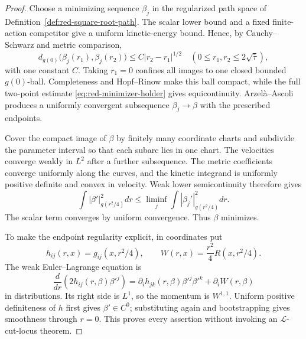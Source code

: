 \documentclass[10pt]{coll-l}
\theoremstyle{definition}
\theoremstyle{remark}
\numberwithin{section}{chapter}
\numberwithin{equation}{chapter}
\begin{document}
\begin{proof}
Choose a minimizing sequence $\beta_j$ in the regularized path space of
Definition~\ref{def:red-square-root-path}.  The scalar lower bound and a
fixed finite-action competitor give a uniform kinetic-energy bound.  Hence,
by Cauchy--Schwarz and metric comparison,
\begin{equation}
 d_{g(0)}\bigl(\beta_j(r_1),\beta_j(r_2)\bigr)
       \leq C|r_2-r_1|^{1/2}
 \quad(0\leq r_1,r_2\leq2\sqrt{\bar\tau}),             \label{eq:red-minimizer-holder}
\end{equation}
with one constant $C$.  Taking $r_1=0$ confines all images to one closed
bounded $g(0)$-ball.  Completeness and Hopf--Rinow make this ball compact,
while the full two-point estimate \eqref{eq:red-minimizer-holder} gives
equicontinuity.  Arzel\`a--Ascoli
produces a uniformly convergent subsequence $\beta_j\to\beta$ with the
prescribed endpoints.

Cover the compact image of $\beta$ by finitely many coordinate charts and
subdivide the parameter interval so that each subarc lies in one chart.
The velocities converge weakly in $L^2$ after a further subsequence.  The
metric coefficients converge uniformly along the curves, and the kinetic
integrand is uniformly positive definite and convex in velocity.  Weak
lower semicontinuity therefore gives
\begin{equation}
 \int|\beta'|^2_{g(r^2/4)}dr
 \leq\liminf_j\int|\beta_j'|^2_{g(r^2/4)}dr.             \label{eq:red-weak-lsc}
\end{equation}
The scalar term converges by uniform convergence.  Thus $\beta$ minimizes.

To make the endpoint regularity explicit, in coordinates put
\begin{equation}
 h_{ij}(r,x)=g_{ij}(x,r^2/4),
 \qquad W(r,x)=\frac{r^2}{4}R(x,r^2/4).                 \label{eq:red-coordinate-Lagrangian-data}
\end{equation}
The weak Euler--Lagrange equation is
\begin{equation}
 \frac d{dr}\left(2h_{ij}(r,\beta)\beta'^j\right)
 =\partial_i h_{jk}(r,\beta)\beta'^j\beta'^k
       +\partial_iW(r,\beta)                            \label{eq:red-coordinate-momentum-equation}
\end{equation}
in distributions.  Its right side is $L^1$, so the momentum is
$W^{1,1}$.  Uniform positive definiteness of $h$ first gives
$\beta'\in C^0$; substituting again and bootstrapping gives smoothness
through $r=0$.  This proves every assertion without invoking an
$\mathcal L$-cut-locus theorem.
\end{proof}
\end{document}
